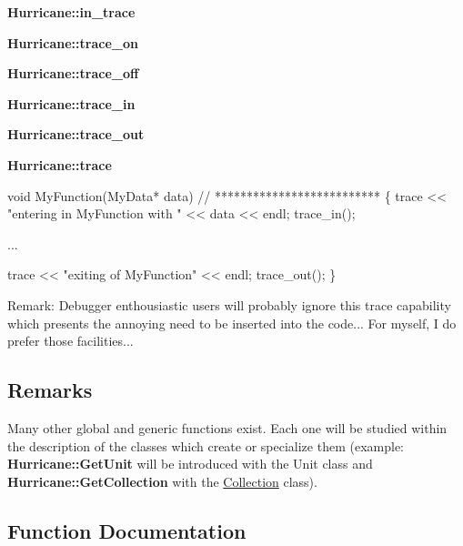 \begin{DoxyItemize}
\item {\bfseries Hurricane\+::in\+\_\+trace} 
\item {\bfseries Hurricane\+::trace\+\_\+on} 
\item {\bfseries Hurricane\+::trace\+\_\+off} 
\item {\bfseries Hurricane\+::trace\+\_\+in} 
\item {\bfseries Hurricane\+::trace\+\_\+out} 
\item {\bfseries Hurricane\+::trace} 
\end{DoxyItemize}


\begin{DoxyCode}
\textcolor{keywordtype}{void} MyFunction(MyData* data)
\textcolor{comment}{// **************************}
\{
   trace << \textcolor{stringliteral}{"entering in MyFunction with "} << data << endl;
   trace\_in();
 
   ...
 
   trace << \textcolor{stringliteral}{"exiting of MyFunction"} << endl;
   trace\_out();
\}
\end{DoxyCode}
 \begin{DoxyParagraph}{Remark\+:}
Debugger enthousiastic users will probably ignore this trace capability which presents the annoying need to be inserted into the code... For myself, I do prefer those facilities...
\end{DoxyParagraph}
\hypertarget{group__Generalities_secGeneralitiesRemarks}{}\subsection{Remarks}\label{group__Generalities_secGeneralitiesRemarks}
Many other global and generic functions exist. Each one will be studied within the description of the classes which create or specialize them (example\+: {\bfseries Hurricane\+::\+Get\+Unit} will be introduced with the Unit class and {\bfseries Hurricane\+::\+Get\+Collection} with the \hyperlink{classHurricane_1_1Collection}{Collection} class). 

\subsection{Function Documentation}
\mbox{\label{group__Generalities_ga93af87d1b7b19294382ba6dae51d0363}} 
